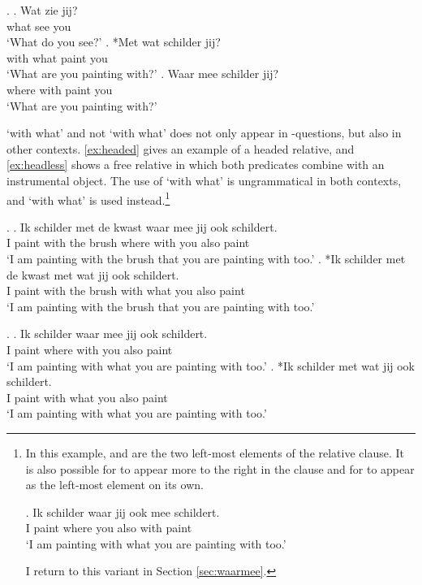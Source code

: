 \documentclass[11pt,a4paper]{article}
\begin{document}
\ex.
\ag. Wat zie jij?\\
 what see you\\
 `What do you see?'\label{ex:wat}
\bg. *Met wat schilder jij?\\
 with what paint you\\
 `What are you painting with?'\label{ex:metwat}
\bg. Waar mee schilder jij?\\
 where with paint you\\
 `What are you painting with?'\label{ex:waarmee}

 `with what' and not  `with what' does not only appear in -questions, but also in other contexts. \ref{ex:headed} gives an example of a headed relative, and \ref{ex:headless} shows a free relative in which both predicates combine with an instrumental object. The use of  `with what' is ungrammatical in both contexts, and  `with what' is used instead.\footnote{
In this example,  and  are the two left-most elements of the relative clause. It is also possible for  to appear more to the right in the clause and for  to appear as the left-most element on its own.

\exg. Ik schilder waar jij ook mee schildert.\\
 I paint where you also with paint\\
 `I am painting with what you are painting with too.'\label{ex:meealong}

I return to this variant in Section \ref{sec:waarmee}.
}


\ex.\label{ex:headed}
\ag. Ik schilder met de kwast waar mee jij ook schildert.\\
 I paint with the brush where with you also paint\\
 `I am painting with the brush that you are painting with too.'
\bg. *Ik schilder met de kwast met wat jij ook schildert.\\
 I paint with the brush with what you also paint\\
 `I am painting with the brush that you are painting with too.'

 \ex.\label{ex:headless}
 \ag. Ik schilder waar mee jij ook schildert.\\
  I paint where with you also paint\\
  `I am painting with what you are painting with too.'
 \bg. *Ik schilder met wat jij ook schildert.\\
  I paint with what you also paint\\
  `I am painting with what you are painting with too.'
\end{document}
